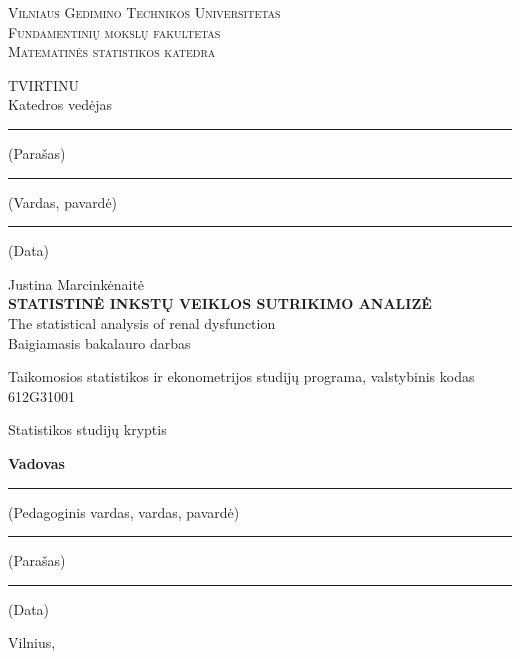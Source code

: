 \documentclass[a4paper, 12pt]{article}
\begin{document}

\begin{titlepage}
\setcounter{page}{-1}
\centering
%
{\Large\scshape Vilniaus Gedimino Technikos Universitetas}\\[0.2\baselineskip]
{\large\scshape Fundamentinių mokslų fakultetas}\\[0.2\baselineskip]
{\large\scshape Matematinės statistikos katedra}\\[0.2\baselineskip]
%
\vspace{\fill}
%
\begin{flushright}
\parbox{6cm}{%
TVIRTINU\\Katedros vedėjas
\bigskip
\begin{center}
\hrule\medskip
{\footnotesize (Parašas)}\\[\baselineskip]
\hrule\medskip
{\footnotesize (Vardas, pavardė)}\\[\baselineskip]
\hrule\medskip
{\footnotesize (Data)}
\end{center}
}
\end{flushright}
%
\vspace{\fill}
%
{\Large Justina Marcinkėnaitė}\\[3.0\baselineskip]

\MakeUppercase{\Large\bfseries Statistinė inkstų veiklos sutrikimo analizė}\\[0.3\baselineskip]
{\Large The statistical analysis of renal dysfunction}\\[1.0\baselineskip]

{\Large Baigiamasis bakalauro darbas}

\vspace{\fill}

Taikomosios statistikos ir ekonometrijos studijų programa, valstybinis kodas 612G31001

Statistikos studijų kryptis

\vspace{\fill}
%
\begin{minipage}[t]{0.15\textwidth}
\bfseries Vadovas
\end{minipage}
%
\hspace{\fill}
%
\begin{minipage}[t]{0.4\textwidth}
\centering\hrule\medskip\scriptsize (Pedagoginis vardas, vardas, pavardė)
\end{minipage}
%
\hspace{\fill}
%
\begin{minipage}[t]{0.2\textwidth}
\centering\hrule\medskip\scriptsize (Parašas)
\end{minipage}
%
\hspace{\fill}
%
\begin{minipage}[t]{0.15\textwidth}
\centering\hrule\medskip\scriptsize (Data)
\end{minipage}


\vspace{\fill}
%
Vilnius, \the\year
\end{titlepage}
\end{document}
